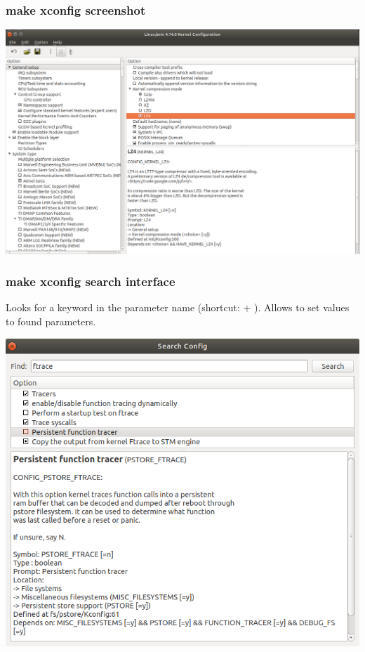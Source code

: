 \begin{frame}
  \frametitle{make xconfig screenshot}
  \begin{center}
    \includegraphics[height=0.8\textheight]{slides/sysdev-kernel-building/xconfig-screenshot.png}
  \end{center}
\end{frame}

\begin{frame}
  \frametitle{make xconfig search interface}
  Looks for a keyword in the parameter name (shortcut: \code{[Ctrl]} + \code{[f]}).
  \newline Allows to set values to found parameters.
  \begin{center}
    \includegraphics[height=0.7\textheight]{slides/sysdev-kernel-building/xconfig-search.png}
  \end{center}
\end{frame}

